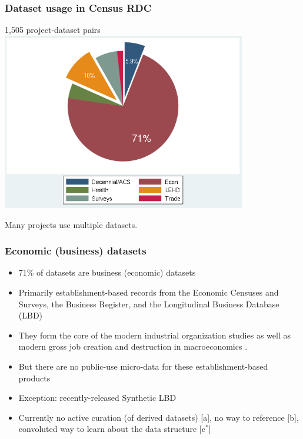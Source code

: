 \begin{frame}
\frametitle{Dataset usage in Census RDC}
\begin{block}{1,505 project-dataset pairs}
\centering
\includegraphics[width=0.8\textwidth]{../pie-chart-rdc-data}
\end{block}
\tiny Many projects use multiple datasets.
\end{frame}

\begin{frame}
\frametitle{Economic (business) datasets}
\begin{itemize}
\item 71\% of datasets are business (economic) datasets
\item Primarily establishment-based records from the
Economic Censuses and Surveys, the Business Register, and the Longitudinal Business Database (LBD)
\item They form the core of the modern
industrial organization studies \cite%
{DunneRobertsSamuelson1989,OlleyPakes1996} as well as modern gross job
creation and destruction in macroeconomics \cite%
{DavisHaltiwangerSchuh,HaltiwangerJarminMiranda2010}.
\item But there are no public-use micro-data for these establishment-based products
\item Exception: recently-released Synthetic LBD \cite%
{AbowdVilhuber2010,KinneyEtAl2011}
\item Currently no active curation (of derived datasets) [a], no way to reference [b], convoluted way to learn about the data structure [c$^*$]
\end{itemize}
\end{frame}

